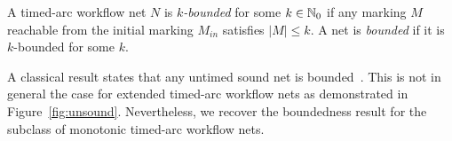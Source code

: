 \begin{definition}[Boundedness]
\label{boundedness}
A %
timed-arc workflow net $N$ is \emph{$k$-bounded}
for some $k \in \mathbb{N}_{0}$ if %
any marking $M$ reachable from the initial marking $M_{in}$
satisfies $|M| \leq k$.
A net is \emph{bounded} if it is $k$-bounded for some $k$.
\end{definition}

A classical result states that any untimed sound net is bounded~\cite{Aalst97}.
This is not in general the case for extended timed-arc
workflow nets 
as demonstrated in Figure~\ref{fig:unsound}. Nevertheless, we recover the boundedness
result for the subclass of monotonic timed-arc workflow nets.

